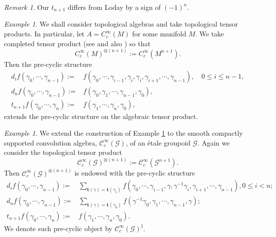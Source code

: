 \documentclass[a4paper]{amsart}
\newcommand{\maC}{\mathcal C}
\newcommand{\maG}{\mathcal G}
\newcommand{\bt}{\mathbf{t}}
\newcommand\<{\langle}
\renewcommand\>{\rangle}
\theoremstyle{definition}
\theoremstyle{remark}
\newtheorem{rem}[theorem]{Remark}
\newtheorem{ex}[theorem]{Example}
\begin{document}
\begin{rem}
Our $t _{n+1}$ differs from Loday \cite[2.1.0]{Loday;Book} by a sign of $(-1)^n$.
\end{rem}

\begin{ex}
\label{CommutativeCyclic}
We shall consider topological algebras and take topological tensor products.
In particular, let $A = C _c ^\infty (M)$ for some manifold $M$.
We take completed tensor product (see\cite{HN77} and also \cite[Appendix B]{Tang;ProperLieCyclic}) so that
$$ C ^\infty _c (M) ^{\otimes (n+1)} := C _c ^\infty (M ^{n+1}) .$$
Then the pre-cyclic structure
\begin{align*}
d _i f (\gamma _0 , \cdots , \gamma _{n-1}) :=&
f (\gamma _0 , \cdots , \gamma_{i-1}, \gamma _i , \gamma _i , \gamma _{i+1}, \cdots , \gamma _{n-1}),
\quad 0 \leqslant i \leqslant n-1, \\
d _n f (\gamma _0 , \cdots , \gamma _{n-1}) :=&
f (\gamma _0 , \gamma_1 , \cdots , \gamma _{n-1}, \gamma_0 ), \\
t _{n+1} f (\gamma _0 , \cdots , \gamma _n) := & f (\gamma _1 , \cdots , \gamma _{n} , \gamma _0),
\end{align*}
extends the pre-cyclic structure on the algebraic tensor product.
\end{ex}

\begin{ex}
\label{CompletedTensor}
\cite[Equation (5)]{Nistor;EtaleCyclicHomology}
We extend the construction of Example \ref{CommutativeCyclic} to the smooth compactly supported convolution algebra,
$\maC^{\infty}_c (\maG)$,
of an \'etale groupoid $\maG$.
Again we consider the topological tensor product
$$ \maC^{\infty}_c (\maG) ^{\otimes (n+1)} := \maC^{\infty}_c (\maG ^{n+1}) .$$
Then $\maC^{\infty}_c (\maG) ^{\otimes (n+1)}$ is endowed with the pre-cyclic structure
\begin{align*}
d _i f (\gamma _0 , \cdots , \gamma _{n-1}) :=&
\sum _{\bt (\gamma) = \bt (\gamma _i)}
f (\gamma _0 , \cdots , \gamma_{i-1}, \gamma , \gamma ^{-1} \gamma _i , \gamma _{i+1}, \cdots , \gamma _{n-1}),
0 \leqslant i < n; \\
d _n f (\gamma _0 , \cdots , \gamma _{n-1}) :=&
\sum _{\bt (\gamma) = \bt (\gamma _0)}
f (\gamma ^{-1} \gamma _0 , \gamma _1 , \cdots , \gamma _{n-1}, \gamma ); \\
t _{n+1} f (\gamma _0 , \cdots , \gamma _n) := & f (\gamma _1 , \cdots , \gamma _{n} , \gamma _0).
\end{align*}
We denote such pre-cyclic object by $\maC^{\infty}_c (\maG) ^\natural$.
\end{ex}
\end{document}
